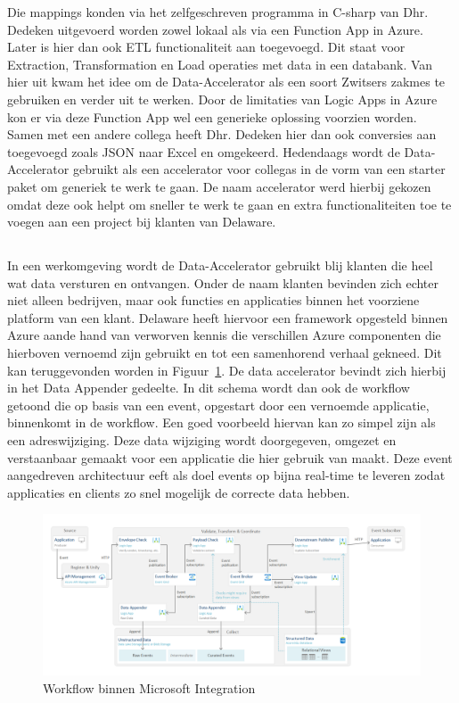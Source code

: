 Die mappings konden via het zelfgeschreven programma in C-sharp van Dhr. Dedeken uitgevoerd worden zowel lokaal als via een Function App in Azure. Later is hier dan ook ETL functionaliteit aan toegevoegd. Dit staat voor Extraction, Transformation en Load operaties met data in een databank. Van hier uit kwam het idee om de Data-Accelerator als een soort Zwitsers zakmes te gebruiken en verder uit te werken. Door de limitaties van Logic Apps in Azure kon er via deze Function App wel een generieke oplossing voorzien worden. Samen met een andere collega heeft Dhr. Dedeken hier dan ook conversies aan toegevoegd zoals JSON naar Excel en omgekeerd. Hedendaags wordt de Data-Accelerator gebruikt als een accelerator voor collegas in de vorm van een starter paket om generiek te werk te gaan. De naam accelerator werd hierbij gekozen omdat deze ook helpt om sneller te werk te gaan en extra functionaliteiten toe te voegen aan een project bij klanten van Delaware.\autocite{LopezNovoa2015}

\subsection{}%
\label{sec:Werkomgeving}

In een werkomgeving wordt de Data-Accelerator gebruikt blij klanten die heel wat data versturen en ontvangen. Onder de naam klanten bevinden zich echter niet alleen bedrijven, maar ook functies en applicaties binnen het voorziene platform van een klant. Delaware heeft hiervoor een framework opgesteld binnen Azure aande hand van verworven kennis die verschillen Azure componenten die hierboven vernoemd zijn gebruikt en tot een samenhorend verhaal gekneed. Dit kan teruggevonden worden in Figuur~\ref{fig:Workflow}. De data accelerator bevindt zich hierbij in het Data Appender gedeelte. In dit schema wordt dan ook de workflow getoond die op basis van een event, opgestart door een vernoemde applicatie, binnenkomt in de workflow. Een goed voorbeeld hiervan kan zo simpel zijn als een adreswijziging. Deze data wijziging wordt doorgegeven, omgezet en verstaanbaar gemaakt voor een applicatie die hier gebruik van maakt. Deze event aangedreven architectuur eeft als doel events op bijna real-time te leveren zodat applicaties en clients zo snel mogelijk de correcte data hebben.

\begin{figure}
    \centering
    \includegraphics[scale=0.60]{../img/Workflow.png}
    \caption{\label{fig:Workflow}Workflow binnen Microsoft Integration}
\end{figure}

